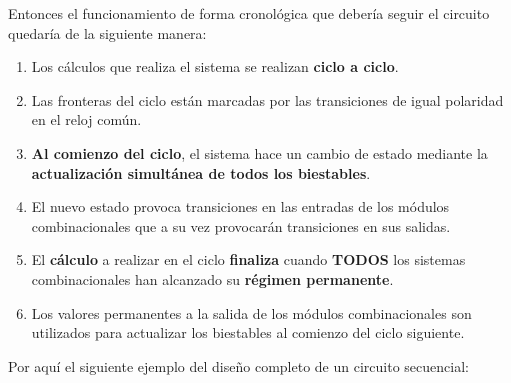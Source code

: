\documentclass[a4paper,10pt]{book}
\begin{document}
Entonces el funcionamiento de forma cronológica que debería seguir el circuito quedaría de la siguiente manera:
\begin{enumerate}
\item Los cálculos que realiza el sistema se realizan \textbf{ciclo a ciclo}.
\item Las fronteras del ciclo están marcadas por las transiciones de igual polaridad en el reloj común.
\item \textbf{Al comienzo del ciclo}, el sistema hace un cambio de estado mediante la \textbf{actualización simultánea de todos los biestables}.
\item El nuevo estado provoca transiciones en las entradas de los módulos combinacionales que a su vez provocarán transiciones en sus salidas.
\item El \textbf{cálculo} a realizar en el ciclo \textbf{finaliza} cuando \textbf{TODOS} los sistemas combinacionales han alcanzado su \textbf{régimen permanente}.
\item Los valores permanentes a la salida de los módulos combinacionales son utilizados para actualizar los biestables al comienzo del ciclo siguiente.
\end{enumerate}

Por aquí el siguiente ejemplo del diseño completo de un circuito secuencial:
\end{document}
